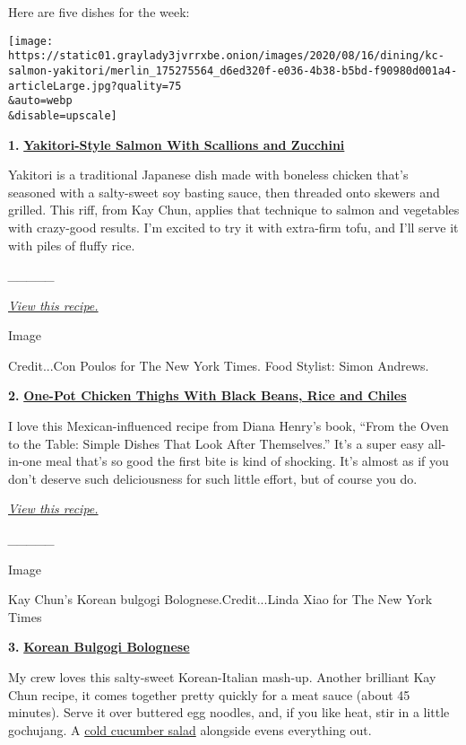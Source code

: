 Here are five dishes for the week:

\texttt{[image: https://static01.graylady3jvrrxbe.onion/images/2020/08/16/dining/kc-salmon-yakitori/merlin\_175275564\_d6ed320f-e036-4b38-b5bd-f90980d001a4-articleLarge.jpg?quality=75\\\&auto=webp\\\&disable=upscale]}

\textbf{1.}
\href{https://cooking.nytimes3xbfgragh.onion/recipes/1021266-yakitori-style-salmon-with-scallions-and-zucchini}{\textbf{Yakitori-Style
Salmon With Scallions and Zucchini}}

Yakitori is a traditional Japanese dish made with boneless chicken
that's seasoned with a salty-sweet soy basting sauce, then threaded onto
skewers and grilled. This riff, from Kay Chun, applies that technique to
salmon and vegetables with crazy-good results. I'm excited to try it
with extra-firm tofu, and I'll serve it with piles of fluffy rice.

\emph{\_\_\_\_\_}

\emph{\href{https://cooking.nytimes3xbfgragh.onion/recipes/1021266-yakitori-style-salmon-with-scallions-and-zucchini}{View
this recipe.}}

Image

Credit...Con Poulos for The New York Times. Food Stylist: Simon Andrews.

\textbf{2.}
\href{https://cooking.nytimes3xbfgragh.onion/recipes/1020457-one-pot-chicken-thighs-with-black-beans-rice-and-chiles}{\textbf{One-Pot
Chicken Thighs With Black Beans, Rice and Chiles}}

I love this Mexican-influenced recipe from Diana Henry's book, ``From
the Oven to the Table: Simple Dishes That Look After Themselves.'' It's
a super easy all-in-one meal that's so good the first bite is kind of
shocking. It's almost as if you don't deserve such deliciousness for
such little effort, but of course you do.

\href{https://cooking.nytimes3xbfgragh.onion/recipes/1020457-one-pot-chicken-thighs-with-black-beans-rice-and-chiles}{\emph{View
this recipe.}}

\emph{\_\_\_\_\_}

Image

Kay Chun's Korean bulgogi Bolognese.Credit...Linda Xiao for The New York
Times

\textbf{3.}
\href{https://cooking.nytimes3xbfgragh.onion/recipes/1019504-korean-bulgogi-bolognese}{\textbf{Korean
Bulgogi Bolognese}}

My crew loves this salty-sweet Korean-Italian mash-up. Another brilliant
Kay Chun recipe, it comes together pretty quickly for a meat sauce
(about 45 minutes). Serve it over buttered egg noodles, and, if you like
heat, stir in a little gochujang. A
\href{https://cooking.nytimes3xbfgragh.onion/recipes/1017629-chinese-smashed-cucumbers-with-sesame-oil-and-garlic}{cold
cucumber salad} alongside evens everything out.

